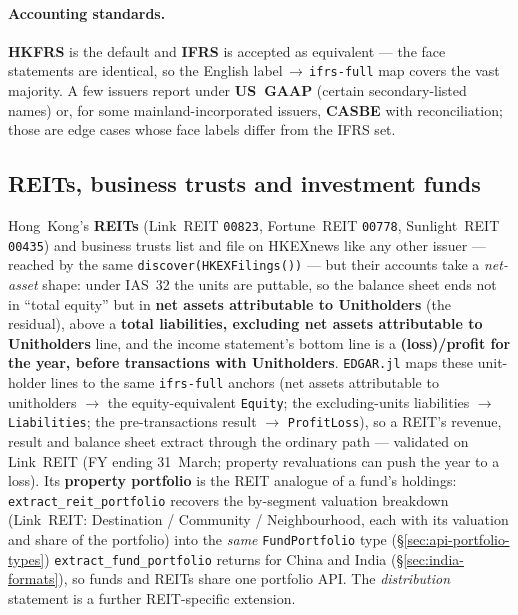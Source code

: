 \documentclass[11pt,a4paper]{report}
\begin{document}
\paragraph{Accounting standards.} \textbf{HKFRS} is the default and \textbf{IFRS} is accepted as equivalent
--- the face statements are identical, so the English label\,$\to$\,\texttt{ifrs-full} map covers the vast
majority. A few issuers report under \textbf{US~GAAP} (certain secondary-listed names) or, for some
mainland-incorporated issuers, \textbf{CASBE} with reconciliation; those are edge cases whose face labels
differ from the IFRS set.

\subsection{REITs, business trusts and investment funds}\label{sec:hk-reits}

Hong~Kong's \textbf{REITs} (Link~REIT \texttt{00823}, Fortune~REIT \texttt{00778}, Sunlight~REIT \texttt{00435})
and business trusts list and file on HKEXnews like any other issuer --- reached by the same
\texttt{discover(HKEXFilings())} --- but their accounts take a \emph{net-asset} shape: under IAS~32 the units
are puttable, so the balance sheet ends not in ``total equity'' but in \textbf{net assets attributable to
Unitholders} (the residual), above a \textbf{total liabilities, excluding net assets attributable to
Unitholders} line, and the income statement's bottom line is a \textbf{(loss)/profit for the year, before
transactions with Unitholders}. \texttt{EDGAR.jl} maps these unit-holder lines to the same \texttt{ifrs-full}
anchors (net assets attributable to unitholders $\to$ the equity-equivalent \texttt{Equity}; the
excluding-units liabilities $\to$ \texttt{Liabilities}; the pre-transactions result $\to$ \texttt{ProfitLoss}),
so a REIT's revenue, result and balance sheet extract through the ordinary path --- validated on Link~REIT (FY
ending 31~March; property revaluations can push the year to a loss). Its \textbf{property portfolio} is the REIT
analogue of a fund's holdings: \texttt{extract\_reit\_portfolio} recovers the by-segment valuation breakdown
(Link~REIT: Destination / Community / Neighbourhood, each with its valuation and share of the portfolio) into
the \emph{same} \texttt{FundPortfolio} type (\S\ref{sec:api-portfolio-types}) \texttt{extract\_fund\_portfolio}
returns for China and India (\S\ref{sec:india-formats}), so funds and REITs share one portfolio API. The \emph{distribution} statement is a
further REIT-specific extension.
\end{document}

